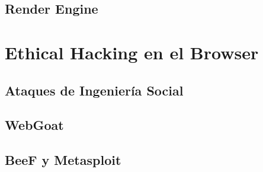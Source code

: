 \subsection{Render Engine}
\label{sec:chap3.1.1}
%

%


\section{Ethical Hacking en el Browser}
\label{sec:chap3.2}
%

\subsection{Ataques de Ingeniería Social}
\label{sec:chap3.2.1}
%

\subsection{WebGoat}
\label{sec:chap3.2.2}
%

\subsection{BeeF y Metasploit}
\label{sec:chap3.2.3}
%






